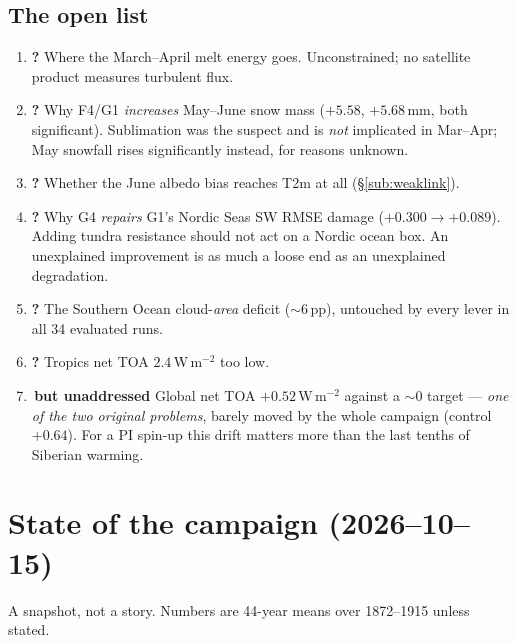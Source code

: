 \documentclass[10pt]{article}
\begin{document}
\subsection{The open list}\label{sub:openlist}
\begin{enumerate}\itemsep2pt
\item \textbf{?} Where the March--April melt energy goes. Unconstrained; no satellite
  product measures turbulent flux.
\item \textbf{?} Why F4/G1 \emph{increases} May--June snow mass ($+5.58$, $+5.68$\,mm,
  both significant). Sublimation was the suspect and is \emph{not} implicated in Mar--Apr;
  May snowfall rises significantly instead, for reasons unknown.
\item \textbf{?} Whether the June albedo bias reaches T2m at all (\S\ref{sub:weaklink}).
\item \textbf{?} Why G4 \emph{repairs} G1's Nordic Seas SW RMSE damage
  ($+0.300 \to +0.089$). Adding tundra resistance should not act on a Nordic ocean box.
  An unexplained improvement is as much a loose end as an unexplained degradation.
\item \textbf{?} The Southern Ocean cloud-\emph{area} deficit ($\sim6$\,pp), untouched by
  every lever in all 34 evaluated runs.
\item \textbf{?} Tropics net TOA $2.4$\,W\,m$^{-2}$ too low.
\item \textbf{\,but unaddressed} Global net TOA $+0.52$\,W\,m$^{-2}$ against a
  $\sim0$ target --- \emph{one of the two original problems}, barely moved by the whole
  campaign (control $+0.64$). For a PI spin-up this drift matters more than the last
  tenths of Siberian warming.
\end{enumerate}

\section{State of the campaign (2026--10--15)}\label{sec:state}
A snapshot, not a story. Numbers are 44-year means over 1872--1915 unless stated.
\end{document}
